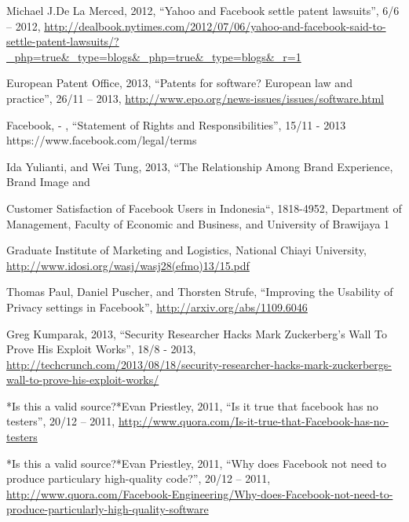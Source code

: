 \documentclass[conference]{IEEEtran}
\begin{document}
\begin{thebibliography}{1}
Michael J.De La Merced, 2012, “Yahoo and Facebook settle patent lawsuits”, 6/6
– 2012,
\href{http://dealbook.nytimes.com/2012/07/06/yahoo-and-facebook-said-to-settle-patent-lawsuits/?\_php=true\&\_type=blogs\&\_php=true\&\_type=blogs\&\_r=1}{http://dealbook.nytimes.com/2012/07/06/yahoo-and-facebook-said-to-settle-patent-lawsuits/?\_php=true\&\_type=blogs\&\_php=true\&\_type=blogs\&\_r=1}

European Patent Office, 2013, “Patents for software? European law and
practice”, 26/11 – 2013, \href{http://www.epo.org/news-issues/issues/software.html}{http://www.epo.org/news-issues/issues/software.html}

Facebook, - , “Statement of Rights and Responsibilities”, 15/11 - 2013
https://www.facebook.com/legal/terms

Ida Yulianti, and Wei Tung, 2013, “The Relationship Among Brand Experience,
Brand Image and

Customer Satisfaction of Facebook Users in Indonesia“, 1818-4952, Department of
Management, Faculty of Economic and Business, and University of Brawijaya 1

Graduate Institute of Marketing and Logistics, National Chiayi University,
\href{http://www.idosi.org/wasj/wasj28(efmo)13/15.pdf}{http://www.idosi.org/wasj/wasj28(efmo)13/15.pdf }

Thomas Paul, Daniel Puscher, and Thorsten Strufe, “Improving the Usability of
Privacy settings in Facebook”, \href{http://arxiv.org/abs/1109.6046}{http://arxiv.org/abs/1109.6046 }

Greg Kumparak, 2013, “Security Researcher Hacks Mark Zuckerberg’s Wall To Prove
His Exploit Works”, 18/8 - 2013,
\href{http://techcrunch.com/2013/08/18/security-researcher-hacks-mark-zuckerbergs-wall-to-prove-his-exploit-works/}{http://techcrunch.com/2013/08/18/security-researcher-hacks-mark-zuckerbergs-wall-to-prove-his-exploit-works/}

*Is this a valid source?*Evan Priestley, 2011, “Is it true that facebook has no
testers”, 20/12 – 2011,
\href{http://www.quora.com/Is-it-true-that-Facebook-has-no-testers}{http://www.quora.com/Is-it-true-that-Facebook-has-no-testers}

*Is this a valid source?*Evan Priestley, 2011, “Why does Facebook not need to
produce particulary high-quality code?”, 20/12 – 2011,
\href{http://www.quora.com/Facebook-Engineering/Why-does-Facebook-not-need-to-produce-particularly-high-quality-software}{http://www.quora.com/Facebook-Engineering/Why-does-Facebook-not-need-to-produce-particularly-high-quality-software}


\end{thebibliography}
\end{document}
